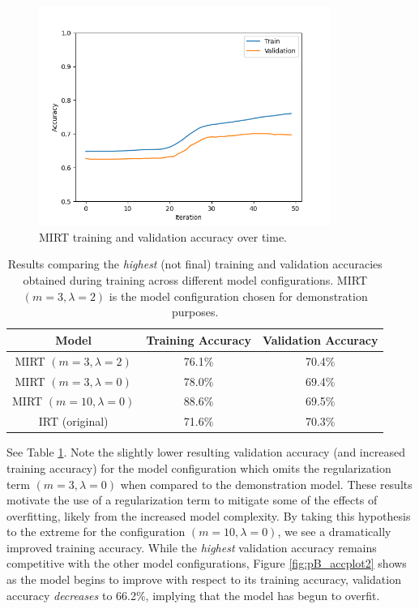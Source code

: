 \documentclass[10pt]{article}
\begin{document}
\begin{figure}[h!]
    \centering
    \includegraphics[width=0.85\textwidth]{final/partb_1.png}
    \caption{MIRT training and validation accuracy over time.}
    \label{fig:pB_accplot1}
\end{figure}

\begin{table}[h!]
    \centering
    \begin{tabular}{c|c|c}
        Model & Training Accuracy & Validation Accuracy \\
        \hline
        MIRT $(m=3, \lambda=2)$ & 76.1\% & 70.4\% \\
        MIRT $(m=3, \lambda=0)$ & 78.0\% & 69.4\% \\
        MIRT $(m=10, \lambda=0)$ & 88.6\% & 69.5\% \\
        IRT (original) & 71.6\% & 70.3\%
    \end{tabular}
    \caption{Results comparing the \textit{highest} (not final) training and validation accuracies obtained during training across different model configurations. MIRT $(m=3, \lambda=2)$ is the model configuration chosen for demonstration purposes.}
    \label{tab:pB_comp}
\end{table}

See Table \ref{tab:pB_comp}. Note the slightly lower resulting validation accuracy (and increased training accuracy) for the model configuration which omits the regularization term $(m=3,\lambda=0)$ when compared to the demonstration model. These results motivate the use of a regularization term to mitigate some of the effects of overfitting, likely from the increased model complexity. By taking this hypothesis to the extreme for the configuration $(m=10,\lambda=0)$, we see a dramatically improved training accuracy. While the \textit{highest} validation accuracy remains competitive with the other model configurations, Figure \ref{fig:pB_accplot2} shows as the model begins to improve with respect to its training accuracy, validation accuracy \textit{decreases} to 66.2\%, implying that the model has begun to overfit.
\end{document}
